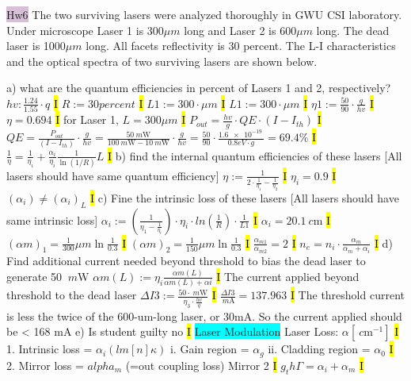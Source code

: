 \documentclass[fontsize=3]{scrartcl}
\begin{document}
\colorbox{Thistle}{Hw6}
The two surviving lasers were analyzed thoroughly in GWU CSI laboratory. Under microscope Laser 1 is $300 \mu m$  long and Laser 2 is $600 \mu m$ long. The dead laser is 1000$\mu m$ long. All facets reflectivity is 30 percent. The L-I characteristics and the optical spectra of two surviving lasers are shown below. 

a) what are the quantum efficiencies in percent of Lasers 1 and 2, respectively?
$hv: \frac{1.24}{1.55}\cdot q$
\hl{I} 
$R:= 30 percent$
\hl{I}
$L1:=300 \cdot \mu m$
\hl{I}
$L1:=300 \cdot \mu m$
\hl{I}
$\eta1:= \frac{50}{90}\cdot \frac{q}{hv}$
\hl{I}
$\eta = 0.694$
\hl{I}
for Laser 1, $L=300 \mu m$
\hl{I}
$P_{out} = \frac{hv}{g} \cdot QE \cdot (I - I_{th})$
\hl{I}
$QE = \frac{P_{out}}{(I-I_{th})} \cdot \frac{g}{hv}  = \frac{ \SI{50}{ m\watt} }{ \SI{100}{ m\watt} - \SI{10}{ m\watt} } \cdot \frac{g}{hv} = \frac{50}{90} \cdot \frac{ \SI{1.6e-19}{ } } { 0.8eV \cdot g} = 69.4 \% $
\hl{I}
$\frac{1}{\eta} = \frac{1}{\eta_i} + \frac{\alpha_i}{\eta_i}\frac{1}{\ln(1/R) }L$
\hl{I}
b) find the internal quantum efficiencies of these lasers [All lasers should have same quantum efficiency]
$\eta:= \frac{1}{2\cdot \frac{1}{\eta_1} - \frac{1}{\eta_2} }$
\hl{I}
$\eta_i = 0.9$
\hl{I}
$(\alpha_i) \neq (\alpha_i)_L$
\hl{I}
c) Fine the intrinsic loss of these lasers [All lasers should have same intrinsic loss]
$\alpha_i := (\frac{1}{\eta_1 - \frac{1}{\eta_i}}) \cdot \eta_i \cdot ln(\frac{1}{R}) \cdot \frac{1}{L1}$
\hl{I}
$\alpha_i = \SI{20.1}{ c\meter}$ 
\hl{I}
$(\alpha m)_1 = \frac{1}{300} \mu m \ln \frac{1}{0.3}$
\hl{I}
$(\alpha m)_2 = \frac{1}{150} \mu m \ln \frac{1}{0.3}$
\hl{I}
$\frac{\alpha_{m1}}{\alpha_{m2}} = 2$
\hl{I}
$n_e = n_i \cdot \frac{\alpha_m}{\alpha_m + \alpha_i}$
\hl{I}
d) Find additional current needed beyond threshold to bias the dead laser to generate 50 $\SI{}{ m\watt}$ 
$\alpha m(L) := \eta_i \frac{\alpha m(L)}{\alpha m(L) + \alpha i}$
\hl{I}
The current applied beyond threshold to the dead laser
$\Delta I3 := \frac{50 \cdot \SI{}{ m\watt}}{ \eta_3 \cdot \frac{hv}{q}}$
\hl{I}
$\frac{\Delta I3} { \SI{}{ m \ampere} } = 137.963$
\hl{I}
The threshold current is less the twice of the 600-um-long laser, or 30mA. So the current applied should be < 168 mA
e) Is student guilty
no
\hl{I}
\colorbox{Cyan}{Laser Modulation}
Laser Loss: $\alpha [\SI{}{ c\meter^{-1}}] $
\hl{I}
1. Intrinsic loss = $\alpha_i (lm[n] \kappa)$
i. Gain region = $\alpha_g$
ii. Cladding region = $\alpha_0$
\hl{I}
2. Mirror loss = $alpha_m$ (=out coupling loss) Mirror 2
\hl{I}
$g_th \Gamma = \alpha_i + \alpha_m$
\hl{I}
\end{document}

